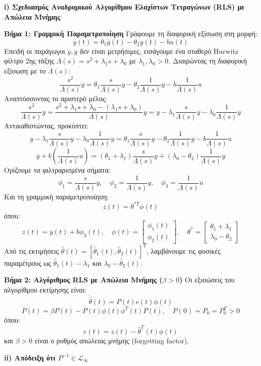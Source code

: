 \documentclass[a4paper,11pt]{article}
\begin{document}
\begin{answer}
\textbf{i) Σχεδιασμός Αναδρομικού Αλγορίθμου Ελαχίστων Τετραγώνων (RLS) με Απώλεια Μνήμης}

\textbf{Βήμα 1: Γραμμική Παραμετροποίηση}
Γράφουμε τη διαφορική εξίσωση στη μορφή:
\[ \ddot{y}(t) = \theta_1 \dot{y}(t) - \theta_2 y(t) - b u(t) \]
Επειδή οι παράγωγοι $\dot{y}, \ddot{y}$ δεν είναι μετρήσιμες, εισάγουμε ένα σταθερό Hurwitz φίλτρο 2ης τάξης $\Lambda(s) = s^2 + \lambda_1 s + \lambda_0$ με $\lambda_1, \lambda_0 > 0$. Διαιρώντας τη διαφορική εξίσωση με το $\Lambda(s)$:
\[ \frac{s^2}{\Lambda(s)} y = \theta_1 \frac{s}{\Lambda(s)} y - \theta_2 \frac{1}{\Lambda(s)} y - b \frac{1}{\Lambda(s)} u \]
Αναπτύσσοντας το αριστερό μέλος:
\[ \frac{s^2}{\Lambda(s)} y = \frac{s^2 + \lambda_1 s + \lambda_0 - (\lambda_1 s + \lambda_0)}{\Lambda(s)} y = y - \lambda_1 \frac{s}{\Lambda(s)} y - \lambda_0 \frac{1}{\Lambda(s)} y \]
Αντικαθιστώντας, προκύπτει:
\[ y - \lambda_1 \frac{s}{\Lambda(s)} y - \lambda_0 \frac{1}{\Lambda(s)} y = \theta_1 \frac{s}{\Lambda(s)} y - \theta_2 \frac{1}{\Lambda(s)} y - b \frac{1}{\Lambda(s)} u \]
\[ y + b \left( \frac{1}{\Lambda(s)} u \right) = (\theta_1 + \lambda_1) \frac{s}{\Lambda(s)} y + (\lambda_0 - \theta_2) \frac{1}{\Lambda(s)} y \]
Ορίζουμε τα φιλτραρισμένα σήματα:
\[ \phi_1 = \frac{s}{\Lambda(s)} y, \quad \phi_2 = \frac{1}{\Lambda(s)} y, \quad \phi_3 = \frac{1}{\Lambda(s)} u \]
Και τη γραμμική παραμετροποίηση:
\[ z(t) = \theta^{*T} \phi(t) \]
όπου:
\[ z(t) = y(t) + b \phi_3(t), \quad \phi(t) = \begin{bmatrix} \phi_1(t) \\ \phi_2(t) \end{bmatrix}, \quad \theta^* = \begin{bmatrix} \theta_1 + \lambda_1 \\ \lambda_0 - \theta_2 \end{bmatrix} \]
Από τις εκτιμήσεις $\hat{\theta}(t) = [\hat{\theta}_1(t), \hat{\theta}_2(t)]^T$, λαμβάνουμε τις φυσικές παραμέτρους ως $\hat{\theta}_1(t) - \lambda_1$ και $\lambda_0 - \hat{\theta}_2(t)$.

\textbf{Βήμα 2: Αλγόριθμος RLS με Απώλεια Μνήμης ($\beta > 0$)}
Οι εξισώσεις του αλγορίθμου εκτίμησης είναι:
\[ \dot{\hat{\theta}}(t) = P(t) e(t) \phi(t) \]
\[ \dot{P}(t) = \beta P(t) - P(t) \phi(t) \phi^T(t) P(t), \quad P(0) = P_0 = P_0^T > 0 \]
όπου:
\[ e(t) = z(t) - \hat{\theta}^T(t) \phi(t) \]
και $\beta > 0$ είναι ο ρυθμός απώλειας μνήμης (forgetting factor).

\textbf{ii) Απόδειξη ότι $P^{-1} \in \mathcal{L}_\infty$}


\end{answer}
\end{document}
